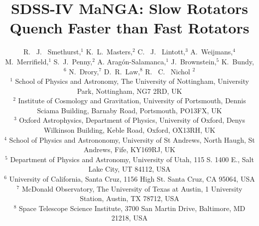 \documentclass[useAMS,usenatbib]{mn2e}
\begin{document}
\title[Quenching Histories of Fast and Slow Rotators]{SDSS-IV MaNGA: Slow Rotators Quench Faster than Fast Rotators}
\author[Smethurst et al. 2017]{R. ~J. ~Smethurst,$^{1}$ K.~L.~Masters,$^{2}$  C. ~J. ~Lintott,$^{3}$ A.~Weijmans,$^{4}$  M.~Merrifield,$^{1}$ \newauthor S.~J.~Penny,$^{2}$ A. Arag\'on-Salamanca,$^{1}$  J.~Brownstein,$^{5}$ K.~Bundy,$^{6}$  N.~Drory,$^{7}$ \newauthor  D.~R.~Law,$^{8}$ R. ~C. ~Nichol $^{2}$ 
\\ $^1$ School of Physics and Astronomy, The University of Nottingham, University Park, Nottingham, NG7 2RD, UK
\\ $^2$ Institute of Cosmology and Gravitation, University of Portsmouth, Dennis Sciama Building, Barnaby Road, Portsmouth, PO13FX, UK 
\\ $^3$ Oxford Astrophysics, Department of Physics, University of Oxford, Denys Wilkinson Building, Keble Road, Oxford, OX13RH, UK
\\ $^4$ School of Physics and Astrononomy, University of St Andrews, North Haugh, St Andrews, Fife, KY169RJ, UK
\\ $^5$ Department of Physics and Astronomy, University of Utah, 115 S. 1400 E., Salt Lake City, UT 84112, USA
\\ $^6$ 	University of California, Santa Cruz, 1156 High St. Santa Cruz, CA 95064, USA
\\ $^7$ McDonald Observatory, The University of Texas at Austin, 1 University Station, Austin, TX 78712, USA
\\ $^8$ Space Telescope Science Institute, 3700 San Martin Drive, Baltimore, MD 21218, USA
}

\maketitle
\end{document}
